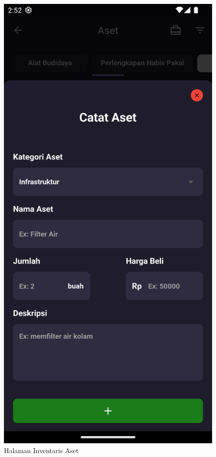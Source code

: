 \begin{spacing}{1.5}
\begin{enumerate}
\begin{enumerate}
\begin{itemize}
\begin{figure}[H]
						\caption{Halaman Inventaris Aset}
					\endminipage\hfill
						\includegraphics[width=\linewidth]{gambar/sprint4/as_2.png}

\end{figure}
\end{itemize}
\end{enumerate}
\end{enumerate}
\end{spacing}
